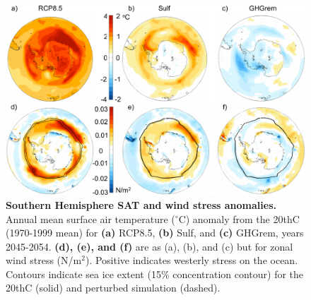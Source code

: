 \documentclass[grl]{AGUTeX}  %
\begin{document}
\begin{article}
\begin{figure}[htbp] %
\centering
 \noindent\includegraphics[width=30pc]{figures/SHmaps3.pdf}
\caption{\textbf{Southern Hemisphere SAT and wind stress anomalies.} Annual mean surface air temperature ($^\circ$C) anomaly from the 20thC (1970-1999 mean) for \textbf{(a)} RCP8.5, \textbf{(b)} Sulf, and \textbf{(c)} GHGrem, years 2045-2054. \textbf{(d), (e), and (f)} are as (a), (b), and (c) but for zonal wind stress (N/m$^2$). Positive indicates westerly stress on the ocean. Contours indicate sea ice extent (15\% concentration contour) for the 20thC (solid) and perturbed simulation (dashed).}
\label{fig:shmaps}
\end{figure}



\end{article}
\end{document}

